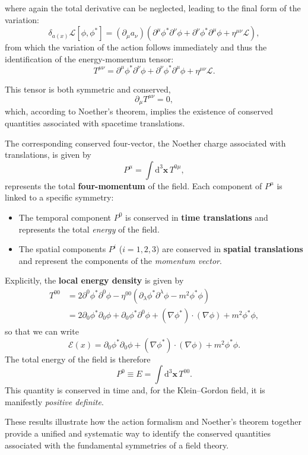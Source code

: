 where again the total derivative can be neglected, leading to the final form of the variation:
\[
    \delta_{a(x)} \mathcal{L}[\phi, \phi^{\ast}] = (\partial_{\mu} a_{\nu}) \left( \partial^{\mu}\phi^{\ast}\partial^{\nu}\phi + \partial^{\nu}\phi^{\ast}\partial^{\mu}\phi + \eta^{\mu\nu} \mathcal{L} \right),
\]
from which the variation of the action follows immediately and thus the identification of the energy-momentum tensor:
\begin{equation}
    T^{\mu\nu} = \partial^{\mu}\phi^{\ast}\partial^{\nu}\phi + \partial^{\nu}\phi^{\ast}\partial^{\mu}\phi + \eta^{\mu\nu}\mathcal{L}.
    \label{eq:energy_momentum_tensor}
\end{equation}

This tensor is both symmetric and conserved,
\[
    \partial_{\mu}T^{\mu\nu} = 0,
\]
which, according to Noether’s theorem, implies the existence of conserved quantities associated with spacetime translations.

The corresponding conserved four-vector, the Noether charge associated with translations, is given by
\[
    P^{\mu} = \int \mathrm{d}^3 \mathbf{x} \, T^{0\mu},
\]
represents the total \textbf{four-momentum} of the field.
Each component of \(P^{\mu}\) is linked to a specific symmetry:
\begin{itemize}
    \item The temporal component \(P^{0}\) is conserved in \textbf{time translations} and represents the total \textit{energy} of the field.
    \item The spatial components \(P^{i}\) (\(i = 1, 2, 3\)) are conserved in \textbf{spatial translations} and represent the components of the \textit{momentum vector}.
\end{itemize}

Explicitly, the \textbf{local energy density} is given by
\[
    \begin{aligned}
        T^{00} & = 2\partial^0 \phi^{\ast} \partial^0 \phi - \eta^{00} \left(\partial_{\lambda} \phi^{\ast} \partial^{\lambda} \phi - m^2 \phi^{\ast} \phi\right) \\
               & = 2\partial_0 \phi^{\ast}\partial_0 \phi +\partial_0 \phi^* \partial^0 \phi + (\nabla\phi^{\ast}) \cdot (\nabla\phi) + m^2 \phi^{\ast}\phi,
    \end{aligned}
\]
so that we can write
\begin{equation}
    \mathcal{E}(x) = \partial_0 \phi^{\ast} \partial_0 \phi + (\nabla\phi^{\ast}) \cdot (\nabla\phi) + m^2 \phi^{\ast}\phi.
    \label{eq:energy_density_KG}
\end{equation}
The total energy of the field is therefore
\[
    P^{0} \equiv E = \int \mathrm{d}^3 \mathbf{x} \, T^{00}.
\]
This quantity is conserved in time and, for the Klein–Gordon field, it is manifestly \textit{positive definite}.

These results illustrate how the action formalism and Noether’s theorem together provide a unified and systematic way to identify the conserved quantities associated with the fundamental symmetries of a field theory.